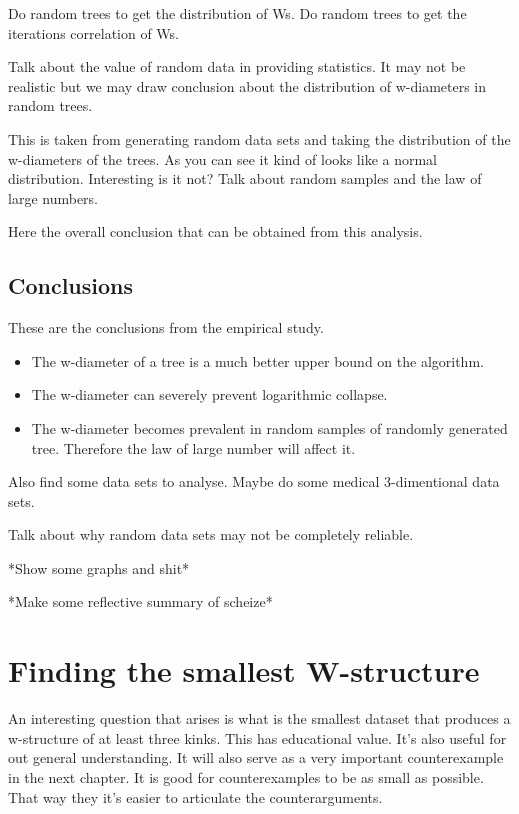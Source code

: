 Do random trees to get the distribution of Ws.
Do random trees to get the iterations correlation of Ws.

Talk about the value of random data in providing statistics. It may not be realistic but we may draw conclusion about the distribution of w-diameters in random trees.

This is taken from generating random data sets and taking the distribution of the w-diameters of the trees. As you can see it kind of looks like a normal distribution. Interesting is it not? Talk about random samples and the law of large numbers.

Here the overall conclusion that can be obtained from this analysis.

\subsection{Conclusions}

These are the conclusions from the empirical study.

\begin{itemize}
    \item The w-diameter of a tree is a much better upper bound on the algorithm.
    \item The w-diameter can severely prevent logarithmic collapse.
    \item The w-diameter becomes prevalent in random samples of randomly generated tree. Therefore the law of large number will affect it.
\end{itemize}


Also find some data sets to analyse. Maybe do some medical 3-dimentional data sets.

Talk about why random data sets may not be completely reliable.

*Show some graphs and shit*

*Make some reflective summary of scheize*

\section{Finding the smallest W-structure}

An interesting question that arises is what is the smallest dataset that produces a w-structure of at least three kinks. This has educational value. It's also useful for out general understanding. It will also serve as a very important counterexample in the next chapter. It is good for counterexamples to be as small as possible. That way they it's easier to articulate the counterarguments.

